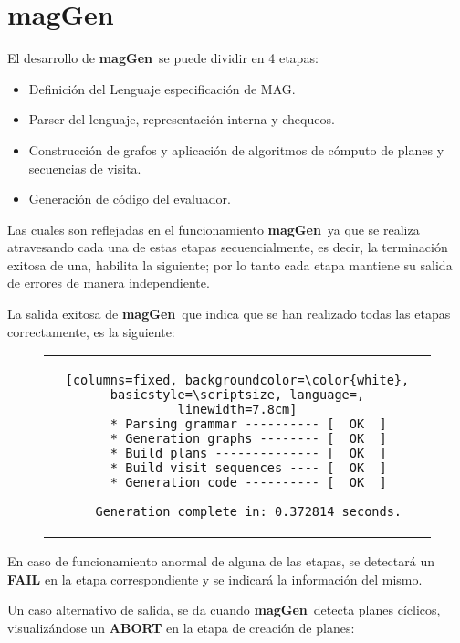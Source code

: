 \documentclass[runningheads,a4paper]{llncs}
\newcommand{\maggen}{\textbf{magGen}}
\begin{document}
\section{\maggen}
\vspace{-0.2cm}
El desarrollo de \maggen\ se puede dividir en 4 etapas: %
\begin{itemize}
\item Definición del Lenguaje especificación de MAG.
\item Parser del lenguaje, representación interna y chequeos.
\item Construcción de grafos y aplicación de algoritmos de cómputo de planes y secuencias de visita.
\item Generación de código del evaluador.
\end{itemize}

Las cuales son reflejadas en el funcionamiento \maggen\, ya que se realiza atravesando cada una de estas etapas secuencialmente, es decir, la terminación exitosa de una, habilita la siguiente; por lo tanto cada etapa mantiene su salida de errores de manera independiente. 

La salida exitosa de \maggen\ que indica que se han realizado todas las etapas correctamente, es la siguiente:

\begin{figure}[!ht]
\vspace{-0.5cm}
\begin{center}
\begin{tabular}{c}
\begin{lstlisting}[columns=fixed, backgroundcolor=\color{white}, basicstyle=\scriptsize, language=, linewidth=7.8cm]
   * Parsing grammar ---------- [  OK  ]
   * Generation graphs -------- [  OK  ]
   * Build plans -------------- [  OK  ]
   * Build visit sequences ---- [  OK  ]
   * Generation code ---------- [  OK  ]

   Generation complete in: 0.372814 seconds.
\end{lstlisting}
\end{tabular}
\end{center}
\end{figure}
\vspace{-0.9cm}

En caso de funcionamiento anormal de alguna de las etapas, se detectará un \textbf{FAIL} en la etapa correspondiente y se indicará la información del mismo.

Un caso alternativo de salida, se da cuando \maggen\ detecta planes cíclicos, visualizándose un \textbf{ABORT} en la etapa de creación de planes:
\end{document}
